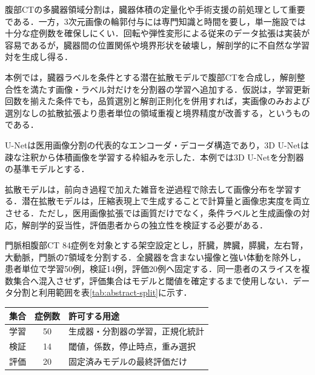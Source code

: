 \begin{center}
  \UsamiFictionalExampleNotice
\end{center}

腹部CTの多臓器領域分割は，臓器体積の定量化や手術支援の前処理として重要である．一方，3次元画像の輪郭付与には専門知識と時間を要し，単一施設では十分な症例数を確保しにくい．回転や弾性変形による従来のデータ拡張は実装が容易であるが，臓器間の位置関係や境界形状を破壊し，解剖学的に不自然な学習対を生成し得る．

本例では，臓器ラベルを条件とする潜在拡散モデルで腹部CTを合成し，解剖整合性を満たす画像・ラベル対だけを分割器の学習へ追加する．仮説は，学習更新回数を揃えた条件でも，品質選別と解剖正則化を併用すれば，実画像のみおよび選別なしの拡散拡張より患者単位の領域重複と境界精度が改善する，というものである．

U-Netは医用画像分割の代表的なエンコーダ・デコーダ構造であり\cite{ronneberger2015unet}，3D U-Netは疎な注釈から体積画像を学習する枠組みを示した\cite{cicek20163dunet}．本例では3D U-Netを分割器の基準モデルとする．

拡散モデルは，前向き過程で加えた雑音を逆過程で除去して画像分布を学習する\cite{ho2020ddpm}．潜在拡散モデルは，圧縮表現上で生成することで計算量と画像忠実度を両立させる\cite{rombach2022ldm}．ただし，医用画像拡張では画質だけでなく，条件ラベルと生成画像の対応，解剖学的妥当性，評価患者からの独立性を検証する必要がある．

門脈相腹部CT 84症例を対象とする架空設定とし，肝臓，脾臓，膵臓，左右腎，大動脈，門脈の7領域を分割する．全臓器を含まない撮像と強い体動を除外し，患者単位で学習50例，検証14例，評価20例へ固定する．同一患者のスライスを複数集合へ混入させず，評価集合はモデルと閾値を確定するまで使用しない．データ分割と利用範囲を表\ref{tab:abstract-split}に示す．

\begin{center}
\small
{}
\label{tab:abstract-split}
\begin{tabularx}{\columnwidth}{l c X}
\toprule
集合 & 症例数 & 許可する用途 \\
\midrule
学習 & 50 & 生成器・分割器の学習，正規化統計 \\
検証 & 14 & 閾値，係数，停止時点，重み選択 \\
評価 & 20 & 固定済みモデルの最終評価だけ \\
\bottomrule
\end{tabularx}
\end{center}

